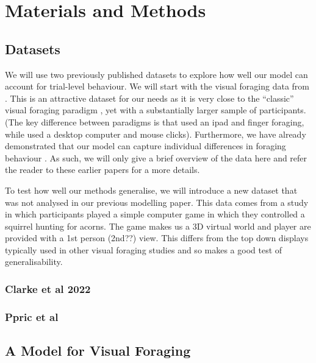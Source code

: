 \documentclass[vision,article,submit,pdftex,moreauthors]{Definitions/mdpi}
\begin{document}
\section{Materials and Methods}

\subsection{Datasets}

We will use two previously published datasets to explore how well our model can account for trial-level behaviour. We will start with the visual foraging data from \cite{clarke2022}. This is an attractive dataset for our needs as it is very close to the ``classic'' visual foraging paradigm \citep{kristjansson2014}, yet with a substantially larger sample of participants. (The key difference between paradigms is that \cite{kristjansson2014} used an ipad and finger foraging, while \cite{clarke2022} used a desktop computer and mouse clicks). Furthermore, we have already demonstrated that our model can capture individual differences in foraging behaviour \citep{clarke2022}. As such, we will only give a brief overview of the data here and refer the reader to these earlier papers for a more details.

To test how well our methods generalise, we will introduce a new dataset that was not analysed in our previous modelling paper. This \cite{prpic2019} data comes from a study in which participants played a simple computer game in which they controlled a squirrel hunting for acorns. The game makes us a 3D virtual world and player are provided with a 1st person (2nd??) view. This differs from the top down displays typically used in other visual foraging studies and so makes a good test of generalisability. 

\subsubsection{Clarke et al 2022}



\subsubsection{Ppric et al}

\subsection{A Model for Visual Foraging}
\end{document}
